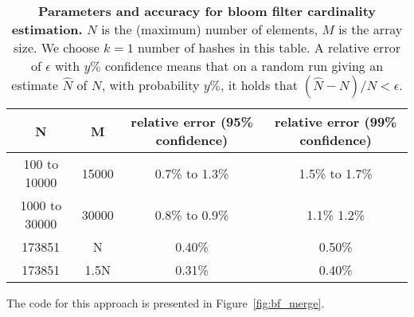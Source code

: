 \begin{table}[H]
\begin{center}
\begin{tabular}{cccc}
\toprule
N & M & relative error (95\% confidence) & relative error (99\% confidence)\\
\midrule
 100 to 10000 & 15000 & 0.7\% to 1.3\% & 1.5\% to 1.7\% \\   
1000 to 30000 & 30000 & 0.8\%  to 0.9\% & 1.1\% 1.2\%\\ 
 173851 & N &  0.40\% & 0.50\% \\   
 173851 & 1.5N & 0.31\% & 0.40\% \\   
\bottomrule
\end{tabular}
\end{center}
\caption{{\bf Parameters and accuracy for bloom filter cardinality estimation.}
$N$ is the (maximum) number of elements, $M$ is the array size.
We choose $k=1$ number of hashes in this table.
A relative error of $\epsilon$ 
with $y\%$ confidence means
that on a random run giving an estimate $\hat{N}$ of $N$, 
with probability $y\%$,  
it holds that $(\hat{N}-N)/N < \epsilon$.
}
\end{table}


The code for this approach is presented in Figure~\ref{fig:bf_merge}.

